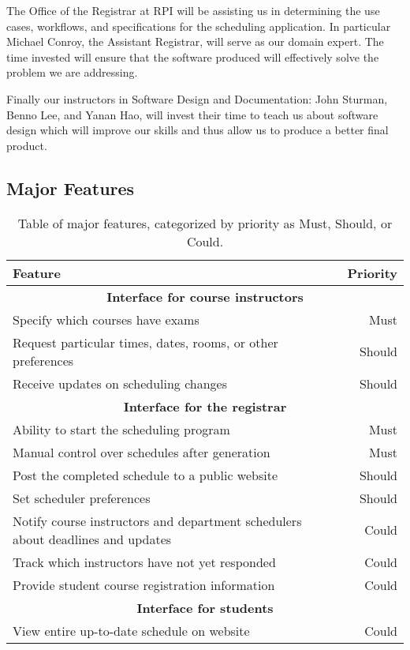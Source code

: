 \documentclass[11pt]{article}
\begin{document}
The Office of the Registrar at RPI will be assisting us in determining the use cases, workflows, and specifications for the scheduling application.  In particular Michael Conroy, the Assistant Registrar, will serve as our domain expert. The time invested will ensure that the software produced will effectively solve the problem we are addressing.  

Finally our instructors in Software Design and Documentation: John Sturman, Benno Lee, and Yanan Hao, will invest their time to teach us about software design which will improve our skills and thus allow us to produce a better final product.  


\subsection{Major Features} %
\begin{table}[htbp]
  \centering
  \begin{tabular} {| l | r |}
    \hline
    \textbf{Feature} & \textbf{Priority} \\ \hline \hline
    \multicolumn{2}{|c|}{\textbf{Interface for course instructors}} \\ \hline
    Specify which courses have exams & Must \\ \hline
    Request particular times, dates, rooms, or other preferences & Should \\ \hline
    Receive updates on scheduling changes & Should \\ \hline
    \multicolumn{2}{|c|}{\textbf{Interface for the registrar}} \\ \hline
    Ability to start the scheduling program & Must \\ \hline
    Manual control over schedules after generation & Must \\ \hline
    Post the completed schedule to a public website & Should \\ \hline
    Set scheduler preferences & Should \\ \hline
    Notify course instructors and department schedulers about deadlines and updates & Could \\ \hline
    Track which instructors have not yet responded & Could \\ \hline
    Provide student course registration information & Could \\ \hline %
    \multicolumn{2}{|c|}{\textbf{Interface for students}} \\ \hline
    View entire up-to-date schedule on website & Could \\ \hline
  \end{tabular}
  \caption{Table of major features, categorized by priority as Must, Should, or Could.}
\end{table}
\end{document}

